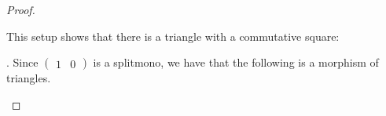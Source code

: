 \documentclass[12pt]{article}
\theoremstyle{definition}
\theoremstyle{remark}
\begin{document}
\begin{proof}
\begin{center}
\begin{tikzcd}[row sep=small]
                    \end{tikzcd}
                \end{center}
                This setup shows that there is a triangle with a commutative square:
                \begin{center}
                \end{center}.
                Since $\begin{pmatrix}1 & 0\end{pmatrix}$ is a splitmono, we have that the following is a morphism of triangles.
                \begin{center}
                \end{center}
            \end{proof}
\end{document}
